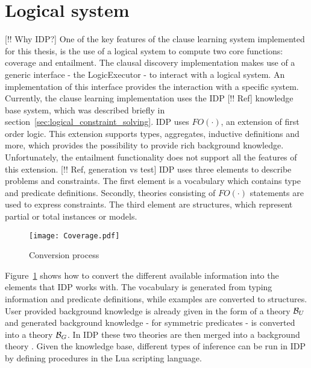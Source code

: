 \section{Logical system} [!! Why IDP?]
\label{sec:logical_system}
One of the key features of the clause learning system implemented for this thesis, is the use of a logical system to compute two core functions: coverage and entailment.
The clausal discovery implementation makes use of a generic  interface - the LogicExecutor - to interact with a logical system.
An implementation of this interface provides the interaction with a specific system.
Currently, the clause learning implementation uses the IDP [!! Ref] knowledge base system, which was described briefly in section~\ref{sec:logical_constraint_solving}.
IDP uses $FO(\cdotp)$, an extension of first order logic.
This extension supports types, aggregates, inductive definitions and more, which provides the possibility to provide rich background knowledge.
Unfortunately, the entailment functionality does not support all the features of this extension.
[!! Ref, generation vs test] IDP uses three elements to describe problems and constraints.
The first element is a vocabulary which contains type and predicate definitions.
Secondly, theories consisting of $FO(\cdotp)$ statements are used to express constraints.
The third element are structures, which represent partial or total instances or models.

\begin{figure}

	\caption{Conversion process}
	\centering
		\texttt{[image: Coverage.pdf]}
	\label{fig:conversion_to_logic}

\end{figure}

Figure~\ref{fig:conversion_to_logic} shows how to convert the different available information into the elements that IDP works with.
The vocabulary is generated from typing information and predicate definitions, while examples are converted to structures.
User provided background knowledge is already given in the form of a theory $\mathcal{B}_U$ and generated background knowledge - for symmetric predicates - is converted into a theory $\mathcal{B}_G$.
In IDP these two theories are then merged into a background theory .
Given the knowledge base, different types of inference can be run in IDP by defining procedures in the Lua scripting language.

